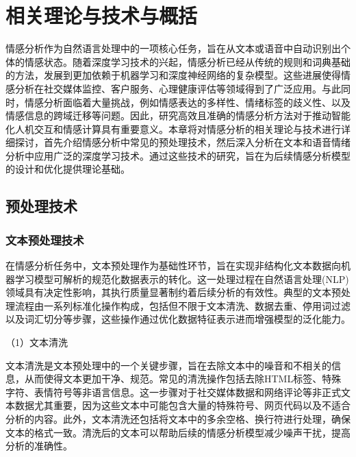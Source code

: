 
\chapter{相关理论与技术与概括}

情感分析作为自然语言处理中的一项核心任务，旨在从文本或语音中自动识别出个体的情感状态。随着深度学习技术的兴起，情感分析已经从传统的规则和词典基础的方法，发展到更加依赖于机器学习和深度神经网络的复杂模型。这些进展使得情感分析在社交媒体监控、客户服务、心理健康评估等领域得到了广泛应用。与此同时，情感分析面临着大量挑战，例如情感表达的多样性、情绪标签的歧义性、以及情感信息的跨域迁移等问题。因此，研究高效且准确的情感分析方法对于推动智能化人机交互和情感计算具有重要意义。本章将对情感分析的相关理论与技术进行详细探讨，首先介绍情感分析中常见的预处理技术，然后深入分析在文本和语音情绪分析中应用广泛的深度学习技术。通过这些技术的研究，旨在为后续情感分析模型的设计和优化提供理论基础。

\section{预处理技术}

\subsection{文本预处理技术}

在情感分析任务中，文本预处理作为基础性环节，旨在实现非结构化文本数据向机器学习模型可解析的规范化数据表示的转化。这一处理过程在自然语言处理(NLP)领域具有决定性影响，其执行质量显著制约着后续分析的有效性。典型的文本预处理流程由一系列标准化操作构成，包括但不限于文本清洗、数据去重、停用词过滤以及词汇切分等步骤，这些操作通过优化数据特征表示进而增强模型的泛化能力。


（1）文本清洗

文本清洗是文本预处理中的一个关键步骤，旨在去除文本中的噪音和不相关的信息，从而使得文本更加干净、规范。常见的清洗操作包括去除HTML标签、特殊字符、表情符号等非语言信息。这一步骤对于社交媒体数据和网络评论等非正式文本数据尤其重要，因为这些文本中可能包含大量的特殊符号、网页代码以及不适合分析的内容。此外，文本清洗还包括将文本中的多余空格、换行符进行处理，确保文本的格式一致。清洗后的文本可以帮助后续的情感分析模型减少噪声干扰，提高分析的准确性。

